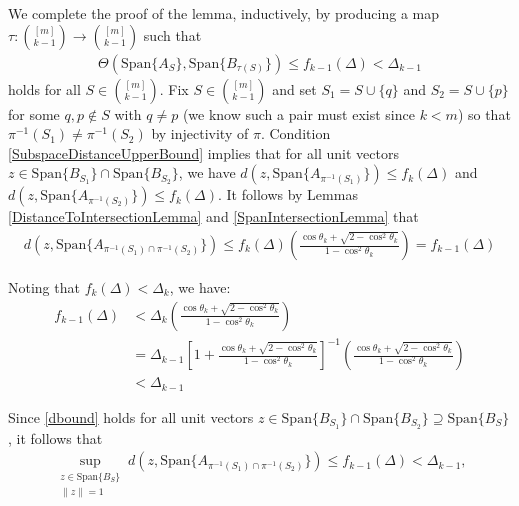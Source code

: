 \documentclass[journal,onecolumn]{IEEEtran}
\begin{document}
We complete the proof of the lemma, inductively, by producing a map $\tau: {[m] \choose k-1} \to {[m] \choose k-1}$ such that
\begin{align}
\Theta(\text{Span}\{A_S\}, \text{Span}\{B_{\tau(S)}\}) \leq f_{k-1}(\Delta) < \Delta_{k-1}
\end{align}
%
holds for all $S \in {[m] \choose k-1}$. Fix $S \in {[m] \choose k-1}$ and set $S_1 = S \cup \{q\}$ and $S_2 = S \cup \{p\}$ for some $q,p \notin S$ with $q \neq p$ (we know such a pair must exist since $k < m$) so that $\pi^{-1}(S_1) \neq \pi^{-1}(S_2)$ by injectivity of $\pi$. Condition \eqref{SubspaceDistanceUpperBound} implies that for all unit vectors $z \in \text{Span}\{B_{S_1}\} \cap \text{Span}\{B_{S_2}\}$, we have $d(z, \text{Span}\{A_{\pi^{-1}(S_1)}\}) \leq f_k(\Delta)$ and $d(z, \text{Span}\{A_{\pi^{-1}(S_2)}\}) \leq f_k(\Delta)$. It follows by Lemmas \ref{DistanceToIntersectionLemma} and \ref{SpanIntersectionLemma} that
\begin{align}\label{dbound}
d\left( z, \text{Span}\{A_{\pi^{-1}(S_1) \cap \pi^{-1}(S_2)} \} \right)
\leq f_k(\Delta) \left( \frac{ \cos\theta_k + \sqrt{2 - \cos^2\theta_k} }{1 - \cos^2\theta_k} \right)
= f_{k-1}(\Delta)
\end{align}

Noting that $f_k(\Delta) < \Delta_k$, we have:
\begin{align}\label{ltdk}
f_{k-1}(\Delta) &< \Delta_k \left( \frac{ \cos\theta_k + \sqrt{2 - \cos^2\theta_k} }{1 - \cos^2\theta_k} \right) \nonumber \\
&= \Delta_{k-1} \left[ 1 + \frac{\cos\theta_k + \sqrt{2 - \cos^2\theta_k}}{1 - \cos^2\theta_k} \right]^{-1}  \left( \frac{ \cos\theta_k + \sqrt{2 - \cos^2\theta_k} }{1 - \cos^2\theta_k} \right) \nonumber \\
&< \Delta_{k-1} 
\end{align}

Since \eqref{dbound} holds for all unit vectors $z \in \text{Span}\{B_{S_1}\} \cap \text{Span}\{B_{S_2}\} \supseteq \text{Span}\{B_S\}$, it follows that
\begin{align}\label{dlt}
\sup_{ \substack{ z \in \text{Span}\{B_{S} \}\\ \|z\|=1} } d\left(z, \text{Span}\{A_{\pi^{-1}(S_1) \cap \pi^{-1}(S_2)}\}  \right) \leq f_{k-1}(\Delta) < \Delta_{k-1},
\end{align}
\end{document}
